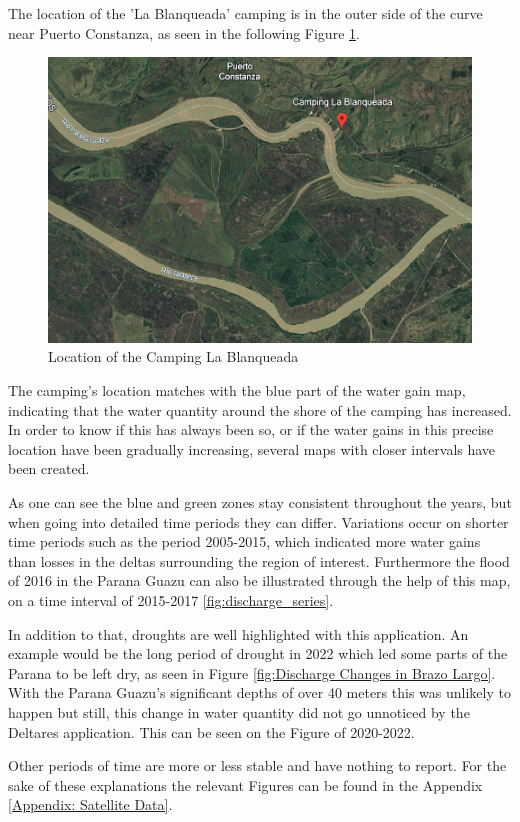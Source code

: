 The location of the 'La Blanqueada' camping  is in the outer side of the curve near Puerto Constanza, as seen in the following Figure \ref{fig:Camping Blanqueada}.

\begin{figure}[H]
    \centering
    \includegraphics[width=0.5\linewidth]{figures/ch5/Camping Blanqueada.png}
    \caption{Location of the Camping La Blanqueada}
    \label{fig:Camping Blanqueada}
\end{figure}

The camping's location matches with the blue part of the water gain map, indicating that the water quantity around the shore of the camping has increased. 
In order to know if this has always been so, or if the water gains in this precise location have been gradually increasing, several maps with closer intervals have been created. 

As one can see the blue and green zones stay consistent throughout the years, but when going into detailed time periods they can differ. Variations occur on shorter time periods such as the period 2005-2015, which indicated more water gains than losses in the deltas surrounding the region of interest. Furthermore the flood of 2016 in the Parana Guazu can also be illustrated through the help of this map, on a time interval of 2015-2017 \ref{fig:discharge_series}.

In addition to that, droughts are well highlighted with this application. An example would be the long period of drought in 2022 which led some parts of the Parana to be left dry, as seen in Figure \ref{fig:Discharge Changes in Brazo Largo}. With the Parana Guazu's significant depths of over 40 meters this was unlikely to happen but still, this change in water quantity did not go unnoticed by the Deltares application. This can be seen on the Figure of 2020-2022.

Other periods of time are more or less stable and have nothing to report. For the sake of these explanations the relevant Figures can be found in the Appendix \ref{Appendix: Satellite Data}.

